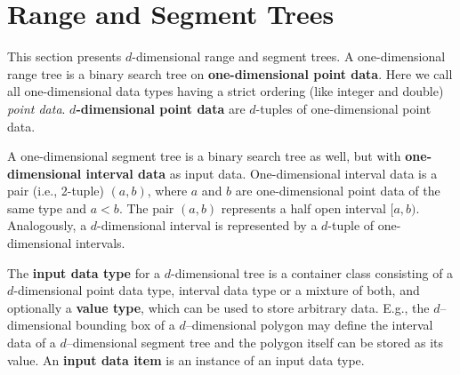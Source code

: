 
%
%
%
%
%
\section{Range and Segment Trees}
\label{User:s-rangesegment}

This section presents $d$-dimensional range and segment trees.
A one-dimensional range tree is a binary search tree on 
{\bf{one-dimensional point data}}. 
Here we call all one-dimensional data types having a strict ordering
(like integer and double) {\em point data}. 
{\bf{$d$-dimensional point data}} are $d$-tuples of one-dimensional 
point data.

A one-dimensional segment tree is a binary search tree as well, but with
{\bf{one-dimensional interval data}} as input data.
One-dimensional interval data is a pair (i.e., 2-tuple) $(a,b)$, where $a$ 
and $b$ are one-dimensional point data of the same type and $a< b$. 
The pair $(a,b)$ represents a half open interval $[a,b)$.
Analogously, a $d$-dimensional interval  is represented by a $d$-tuple of
one-dimensional intervals.

The {\bf{input data type}} for a $d$-dimensional tree is a container 
class consisting of a $d$-dimensional point data type, interval data type 
or a mixture of both, and optionally a {\bf{value type}}, which 
can be used to store arbitrary data. 
E.g., the $d$--dimensional bounding box of a $d$--dimensional polygon 
may define the interval data of a $d$--dimensional segment tree and
the polygon itself can be stored as its value.   
An {\bf{input data item}} is an instance of an input data type.

